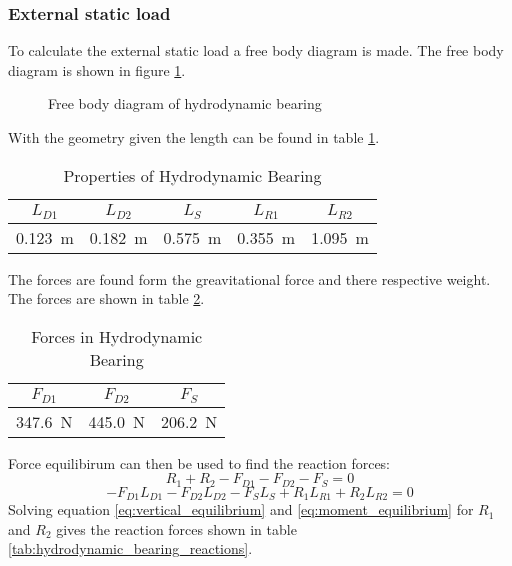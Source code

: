 \subsubsection{External static load}
To calculate the external static load a free body diagram is made. The free body diagram is shown in figure \ref{fig:free_body_diagram}.
\begin{figure}[htbp]
    \centering
    
    \caption{Free body diagram of hydrodynamic bearing}
    \label{fig:free_body_diagram}
\end{figure}
With the geometry given the length can be found in table \ref{tab:hydrodynamic_bearing_properties}.
\begin{table}[htbp]
    \centering
    \caption{Properties of Hydrodynamic Bearing}
    \label{tab:hydrodynamic_bearing_properties}
    \begin{tabular}{@{}ccccc@{}}
        \toprule
        $L_{D1}$    &   $L_{D2}$    &   $L_S$   &   $L_{R1}$   &   $L_{R2}$   \\ \midrule
        \SI{0.123}{\meter}  &   \SI{0.182}{\meter}  &   \SI{0.575}{\meter}   &   \SI{0.355}{\meter}   &   \SI{1.095}{\meter}   \\ \bottomrule
    \end{tabular}
\end{table}
The forces are found form the greavitational force and there respective weight. The forces are shown in table \ref{tab:hydrodynamic_bearing_forces}.
\begin{table}[htbp]
    \centering
    \caption{Forces in Hydrodynamic Bearing}
    \label{tab:hydrodynamic_bearing_forces}
    \begin{tabular}{@{}ccc@{}}
        \toprule
        $F_{D1}$    &   $F_{D2}$    &   $F_S$   \\ \midrule
        \SI{347.6}{\newton}  &   \SI{445.0}{\newton}  &   \SI{206.2}{\newton}   \\ \bottomrule
    \end{tabular}
\end{table}
Force equilibirum can then be used to find the reaction forces:
\begin{equation}
    R_1 + R_2 - F_{D1} - F_{D2} - F_S = 0
    \label{eq:vertical_equilibrium}
\end{equation}
\begin{equation}
    -F_{D1} L_{D1} - F_{D2} L_{D2} - F_S L_S + R_1 L_{R1} + R_2 L_{R2} = 0
    \label{eq:moment_equilibrium}
\end{equation}
Solving equation \ref{eq:vertical_equilibrium} and \ref{eq:moment_equilibrium} for $R_1$ and $R_2$ gives the reaction forces shown in table \ref{tab:hydrodynamic_bearing_reactions}.
